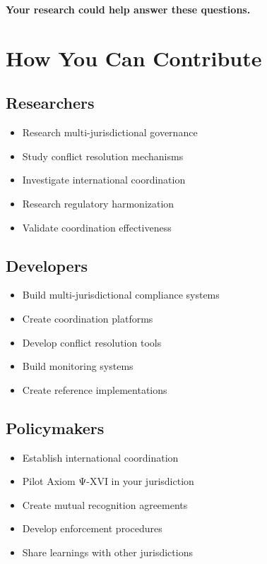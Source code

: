 \textbf{Your research could help answer these questions.}

\vspace{0.5cm}

\section{How You Can Contribute}

\subsection{Researchers}

\begin{itemize}
    \item Research multi-jurisdictional governance
    \item Study conflict resolution mechanisms
    \item Investigate international coordination
    \item Research regulatory harmonization
    \item Validate coordination effectiveness
\end{itemize}

\subsection{Developers}

\begin{itemize}
    \item Build multi-jurisdictional compliance systems
    \item Create coordination platforms
    \item Develop conflict resolution tools
    \item Build monitoring systems
    \item Create reference implementations
\end{itemize}

\subsection{Policymakers}

\begin{itemize}
    \item Establish international coordination
    \item Pilot Axiom Ψ-XVI in your jurisdiction
    \item Create mutual recognition agreements
    \item Develop enforcement procedures
    \item Share learnings with other jurisdictions
\end{itemize}

